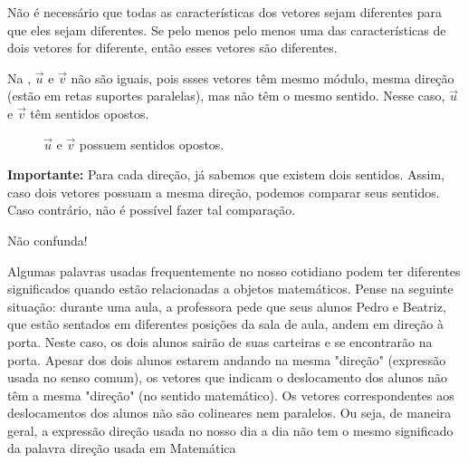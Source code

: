 Não é necessário que todas as características dos vetores sejam diferentes para que eles sejam diferentes. Se pelo menos pelo menos uma das  características de dois vetores for diferente, então esses vetores são diferentes.

Na , \(\vec{u}\) e \(\vec{v}\) não são iguais, pois ssses vetores têm mesmo módulo, mesma direção (estão em retas suportes paralelas), mas não têm o mesmo sentido. Nesse caso, \(\vec{u}\) e \(\vec{v}\) têm sentidos opostos.



\begin{figure}[H]
\centering


\caption{$\vec{u}$ e $\vec{v}$ possuem sentidos opostos.}
\label{fig-geometria-operacoesvetores-06}
\end{figure}

\textbf{Importante:} Para cada direção, já sabemos que existem dois sentidos. Assim, caso dois vetores possuam a mesma direção, podemos comparar seus sentidos. Caso contrário, não é possível fazer tal comparação.

\begin{observationtitle}{Não confunda!}

Algumas palavras usadas frequentemente no nosso cotidiano podem ter diferentes significados quando estão relacionadas a objetos matemáticos. Pense na seguinte situação: durante uma aula, a professora pede que seus alunos Pedro e Beatriz, que estão sentados em diferentes posições da sala de aula, andem em direção à porta. Neste caso, os dois alunos sairão de suas carteiras e se encontrarão na porta. Apesar dos dois alunos estarem andando na mesma "direção"{} (expressão usada no senso comum), os vetores que indicam o deslocamento dos alunos não têm a mesma "direção"{} (no sentido matemático). Os vetores correspondentes aos deslocamentos dos alunos não são colineares nem paralelos. Ou seja, de maneira geral, a expressão direção usada no nosso dia a dia não tem o mesmo significado da palavra direção usada em Matemática
\end{observationtitle}




